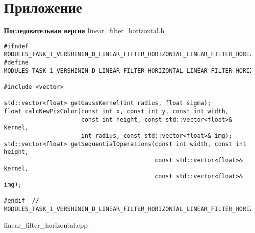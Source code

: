 \documentclass{report}
\begin{document}
\section*{Приложение}
\textbf{Последовательная версия}
\newline
\newline linear\_filter\_horizontal.h
\begin{lstlisting}
#ifndef MODULES_TASK_1_VERSHININ_D_LINEAR_FILTER_HORIZONTAL_LINEAR_FILTER_HORIZONTAL_H_
#define MODULES_TASK_1_VERSHININ_D_LINEAR_FILTER_HORIZONTAL_LINEAR_FILTER_HORIZONTAL_H_

#include <vector>

std::vector<float> getGaussKernel(int radius, float sigma);
float calcNewPixColor(const int x, const int y, const int width,
                      const int height, const std::vector<float>& kernel,
                      int radius, const std::vector<float>& img);
std::vector<float> getSequentialOperations(const int width, const int height,
                                           const std::vector<float>& kernel,
                                           const std::vector<float>& img);

#endif  // MODULES_TASK_1_VERSHININ_D_LINEAR_FILTER_HORIZONTAL_LINEAR_FILTER_HORIZONTAL_H_
\end{lstlisting}
linear\_filter\_horizontal.cpp
\end{document}

